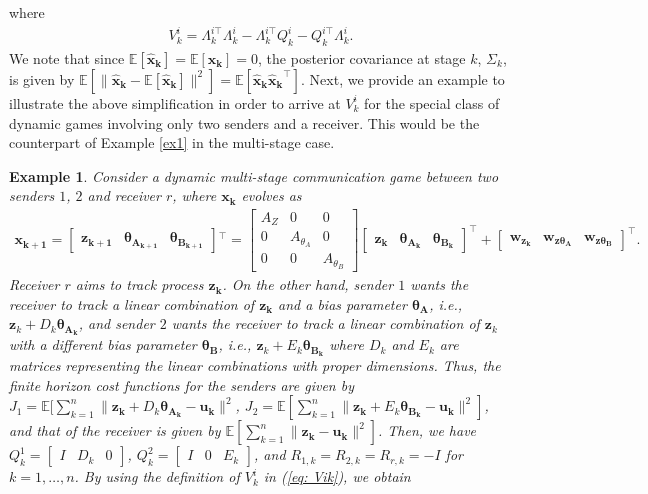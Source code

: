\documentclass[12pt,journal,onecolumn]{IEEEtran}
\newtheorem{example}{Example}
\newcommand{\rknote}[1]{\noindent{\leavevmode\color{red}[Raj -- #1]}}
\begin{document}
where 
\begin{align}\label{eq: Vik}
V_k^i=\Lambda_k^{i\top}\Lambda_k^i-\Lambda_k^{i\top}Q_k^i-Q_k^{i\top}\Lambda_k^{i}.
\end{align}
We note that since $\mathbb{E}[\boldsymbol{\hat{x}_k}]=\mathbb{E}[\boldsymbol{x_k}]=0$, the posterior covariance at stage $k$, $\Sigma_k$, is given by $\mathbb{E}[\|\boldsymbol{\hat{x}_k}-\mathbb{E}[\boldsymbol{\hat{x}_k}]\|^2]=\mathbb{E}[\boldsymbol{\hat{x}_k}\boldsymbol{\hat{x}_k}^\top]$. Next, we provide an example to illustrate the above simplification in order to arrive at $V_k^i$ for the special class of  dynamic games involving only two senders and a receiver. This would be the counterpart of Example \ref{ex1} in the multi-stage case.
\begin{example} Consider a dynamic multi-stage communication game between two senders $1$, $2$ and receiver $r$, where $\boldsymbol{x_k}$ evolves as 
\begin{align*}
    \boldsymbol{x_{k+1}}\!=\!\begin{bmatrix}\boldsymbol{z_{k+1}}&\boldsymbol{\theta_{A_{k+1}}}&\boldsymbol{\theta_{B_{k+1}}}\end{bmatrix}\!^\top\!\!=\!\begin{bmatrix}A_Z &0&0\\ 0&A_{\theta_A}&0\\0&0&A_{\theta_B}\end{bmatrix}\begin{bmatrix}\boldsymbol{z_{k}}&\boldsymbol{\theta_{A_{k}}}&\boldsymbol{\theta_{B_{k}}}\end{bmatrix}^\top\!\!\!+\begin{bmatrix}\boldsymbol{w_{z_k}}&\boldsymbol{w_{z\theta_A}}&\boldsymbol{w_{z\theta_B}}\end{bmatrix}^\top\!\!\!\!.
\end{align*}
 Receiver $r$ aims to track process $\mathbf{z_k}$. On the other hand, sender $1$ wants the receiver to track a linear combination of $\mathbf{z_k}$ and a bias parameter $\boldsymbol{\theta_A}$, i.e., $\boldsymbol{z}_k+D_k\boldsymbol{\theta_{A_k}}$, and sender $2$ wants the receiver to track a linear combination of $\mathbf{z}_k$ with a different bias parameter $\boldsymbol{\theta_B}$, i.e.,  $\mathbf{z}_k+E_k\boldsymbol{\theta_{B_k}}$ where $D_k$ and $E_k$ are matrices representing the linear combinations with proper dimensions. Thus, the finite horizon cost functions for the senders are given by $J_{1}=\mathbb{E}[\sum_{k=1}^n\|\boldsymbol{z_k}+D_k\boldsymbol{\theta_{A_k}}-\boldsymbol{u_k}\|^2$, $J_{2}=\mathbb{E}[\sum_{k=1}^n\|\boldsymbol{z_k}+E_k\boldsymbol{\theta_{B_k}}-\boldsymbol{u_k}\|^2]$, and that of the receiver is given by $\mathbb{E}[\sum_{k=1}^n\|\boldsymbol{z_k}-\boldsymbol{u_k}\|^2]$. Then, we have $Q_k^1=\begin{bmatrix}I&D_k&0\end{bmatrix}$, $Q_k^2=\begin{bmatrix}I&0&E_k\end{bmatrix}$, and $R_{1,k}=R_{2,k}=R_{r,k}=-I$ for $k=1,\hdots,n$. By using the definition of $V_k^i$ in (\ref{eq: Vik}), we obtain

\end{example}
\end{document}
